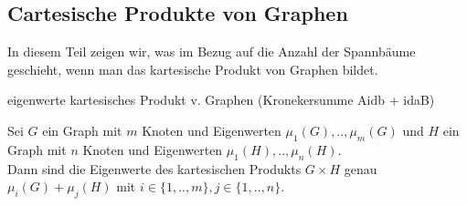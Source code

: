 \subsection{Cartesische Produkte von Graphen}
In diesem Teil zeigen wir, was im Bezug auf die Anzahl der Spannbäume geschieht, wenn man das kartesische Produkt von Graphen bildet. %
\begin{Lm}
eigenwerte kartesisches Produkt v. Graphen (Kronekersumme Aidb + idaB)
\end{Lm}

\begin{Tms}
 Sei $G$ ein Graph mit $m$ Knoten und Eigenwerten $\mu_1(G),..,\mu_m(G)$ und $H$ ein Graph mit $n$ Knoten und Eigenwerten $\mu_1(H),..,\mu_n(H)$. \\
 Dann sind die Eigenwerte des kartesischen Produkts $G \times H$ genau $\mu_i(G)+\mu_j(H)$ mit $i \in \{ 1,..,m\}, j \in \{ 1,..,n\}$.
\end{Tms}

